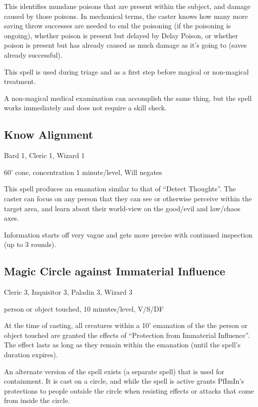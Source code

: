 This identifies mundane poisons that are present within the subject, and
damage caused by those poisons. In mechanical terms, the caster knows
how many more saving throw successes are needed to end the poisoning (if
the poisoning is ongoing), whether poison is present but delayed by Delay
Poison, or whether poison is present but has already caused as much damage
as it's going to (saves already successful).

This spell is used during triage and as a first step before magical or
non-magical treatment.

A non-magical medical examination can accomplish the same thing, but the
spell works immediately and does not require a skill check.
%

%
\subsection{Know Alignment}

Bard 1, Cleric 1, Wizard 1

60' cone, concentration 1 minute/level, Will negates

This spell produces an emanation similar to that of ``Detect Thoughts''.
The caster can focus on any person that they can see or otherwise perceive
within the target area, and learn about their world-view on the good/evil
and law/chaos axes.

Information starts off very vague and gets more precise with continued
inspection (up to 3 rounds).
%

%
\subsection{Magic Circle against Immaterial Influence}

Cleric 3, Inquisitor 3, Paladin 3, Wizard 3

person or object touched, 10 minutes/level, V/S/DF

At the time of casting, all creatures within a 10' emanation of the the
person or object touched are granted the effects of ``Protection from
Immaterial Influence''. The effect lasts as long as they remain within the
emanation (until the spell's duration expires).

An alternate version of the spell exists (a separate spell) that is used
for containment. It is cast on a circle, and while the spell is active
grants PfImIn's protections to people outside the circle when resisting
effects or attacks that come from inside the circle.

